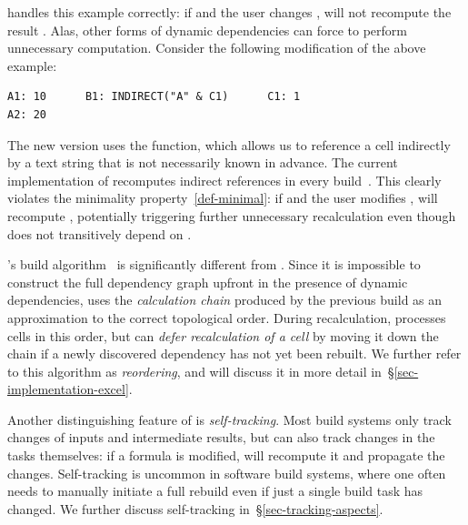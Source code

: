 \Excel handles this example correctly: if  and the user changes
, \Excel will not recompute the result . Alas, other forms of
dynamic dependencies can force \Excel to perform unnecessary computation.
Consider the following modification of the above example:

\vspace{1mm}
\begin{verbatim}
A1: 10      B1: INDIRECT("A" & C1)      C1: 1
A2: 20
\end{verbatim}
\vspace{1mm}

\noindent
The new version uses the  function, which allows us to reference a
cell indirectly by a text string that is not necessarily known in advance. The
current implementation of \Excel recomputes indirect references in every
build~\cite{excel_recalc}. This clearly violates the minimality
property~\ref{def-minimal}: if  and the user modifies , \Excel
will recompute , potentially triggering further unnecessary
recalculation even though  does not transitively depend on .

\Excel's build algorithm~\cite{excel_recalc} is significantly different from
\Make. Since it is impossible to construct the full dependency graph upfront in
the presence of dynamic dependencies, \Excel uses the \emph{calculation chain}
produced by the previous build as an approximation to the correct topological
order. During recalculation, \Excel processes cells in this order, but can
\emph{defer recalculation of a cell} by moving it down the chain if a newly
discovered dependency has not yet been rebuilt. We further refer to this
algorithm as \emph{reordering}, and will discuss it in more detail
in~\S\ref{sec-implementation-excel}.

Another distinguishing feature of \Excel is \emph{self-tracking}. Most build
systems only track changes of inputs and intermediate results, but \Excel can
also track changes in the tasks themselves: if a formula is modified, \Excel
will recompute it and propagate the changes. Self-tracking is uncommon in
software build systems, where one often needs to manually initiate a full
rebuild even if just a single build task has changed. We further discuss
self-tracking in~\S\ref{sec-tracking-aspects}.

